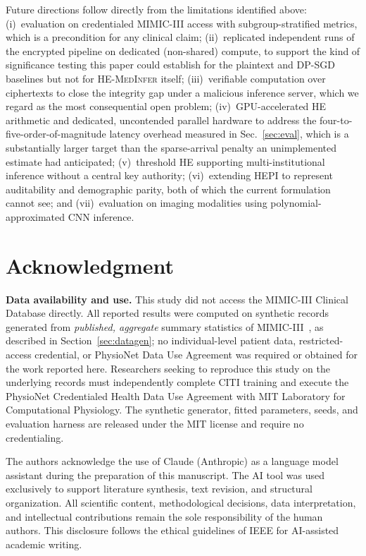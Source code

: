 \documentclass[journal,compsoc]{IEEEtran}
\newcommand{\HEPI}{\textsc{HEPI}}          %
\newcommand{\framework}{\textsc{HE-MedInfer}}
\begin{document}
Future directions follow directly from the limitations identified above:
(i)~evaluation on credentialed MIMIC-III access with subgroup-stratified
metrics, which is a precondition for any clinical claim; (ii)~replicated
independent runs of the encrypted pipeline on dedicated (non-shared) compute,
to support the kind of significance testing this paper could establish for
the plaintext and DP-SGD baselines but not for \framework{} itself;
(iii)~verifiable computation over ciphertexts to close the integrity gap under
a malicious inference server, which we regard as the most consequential open
problem; (iv)~GPU-accelerated HE arithmetic and dedicated, uncontended
parallel hardware to address the four-to-five-order-of-magnitude latency
overhead measured in Sec.~\ref{sec:eval}, which is a substantially larger
target than the sparse-arrival penalty an unimplemented estimate had
anticipated; (v)~threshold HE supporting multi-institutional inference
without a central key authority; (vi)~extending \HEPI{} to represent
auditability and demographic parity, both of which the current formulation
cannot see; and (vii)~evaluation on imaging modalities using
polynomial-approximated CNN inference.

\section*{Acknowledgment}

\textbf{Data availability and use.} This study did not access the MIMIC-III
Clinical Database directly. All reported results were computed on synthetic
records generated from \emph{published, aggregate} summary statistics of
MIMIC-III~\cite{johnson2016mimic,harutyunyan2019multitask}, as described in
Section~\ref{sec:datagen}; no individual-level patient data, restricted-access
credential, or PhysioNet Data Use Agreement was required or obtained for the
work reported here. Researchers seeking to reproduce this study on the
underlying records must independently complete CITI training and execute the
PhysioNet Credentialed Health Data Use Agreement with MIT Laboratory for
Computational Physiology. The synthetic generator, fitted parameters, seeds,
and evaluation harness are released under the MIT license and require no
credentialing.

The authors acknowledge the use of Claude (Anthropic) as a language model
assistant during the preparation of this manuscript. The AI tool was used
exclusively to support literature synthesis, text revision, and structural
organization. All scientific content, methodological decisions, data
interpretation, and intellectual contributions remain the sole responsibility
of the human authors. This disclosure follows the ethical guidelines of IEEE
for AI-assisted academic writing.
\end{document}
